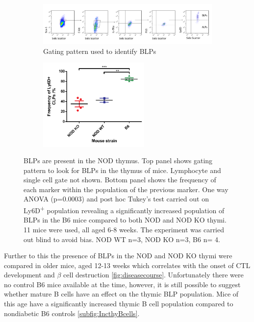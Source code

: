 \begin{figure}
	\begin{subfigure}{\textwidth}
	\includegraphics[width=\textwidth]{Figures/BLPgating.png}
	\caption{Gating pattern used to identify BLPs}
	\label{subfig:BLPgating}
	\end{subfigure}
	\begin{subfigure}{\textwidth}
	\centering
	\includegraphics[width=0.6\textwidth]{Figures/Ly6D.pdf}
	\caption{}
	\label{subfig:BLPgraph}
	\end{subfigure}
\caption[BLPs are significantly decreased in the NOD thymus compared to the B6 thymus]{BLPs are present in the NOD thymus. 
Top panel shows gating pattern to look for BLPs in the thymus of mice. Lymphocyte and single cell gate not shown.
Bottom panel shows the frequency of each marker within the population of the previous marker.
One way ANOVA (p=0.0003) and post hoc Tukey's test carried out on Ly6D\textsuperscript{+} population revealing a significantly increased population of BLPs in the B6 mice compared to both NOD and NOD KO thymi.
11 mice were used, all aged 6-8 weeks. 
The experiment was carried out blind to avoid bias. 
NOD WT n=3, NOD KO n=3, B6 n= 4.}
\label{fig:BLPs}
\end{figure}

Further to this the presence of BLPs in the NOD and NOD KO thymi were compared in older mice, aged 12-13 weeks which correlates with the onset of CTL development and $\beta$ cell destruction \cref{fig:diseasecourse}.
Unfortunately there were no control B6 mice available at the time, however, it is still possible to suggest whether mature B cells have an effect on the thymic BLP population.
Mice of this age have a significantly increased thymic B cell population compared to nondiabetic B6 controls \cref{subfig:IncthyBcells}.


